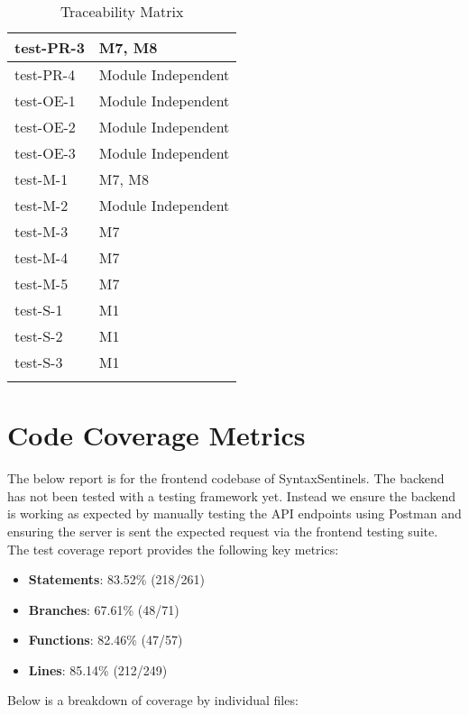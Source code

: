\documentclass[12pt, titlepage]{article}
\begin{document}
\begin{center}
\begin{longtable}{|>{\centering\arraybackslash}p{4cm}|>{\centering\arraybackslash}p{10cm}|}
    test-PR-3 &  M7, M8\\
    \hline
    test-PR-4 &  Module Independent\\
    \hline
    test-OE-1 & Module Independent\\
    \hline
    test-OE-2 & Module Independent\\
    \hline
    test-OE-3 & Module Independent\\
    \hline
    test-M-1 & M7, M8 \\
    \hline
    test-M-2 & Module Independent\\
    \hline
    test-M-3 & M7 \\
    \hline
    test-M-4 & M7 \\
    \hline
    test-M-5 & M7 \\
    \hline
    test-S-1 & M1 \\
    \hline
    test-S-2 & M1 \\
    \hline
    test-S-3 & M1 \\
    \hline
  
    \caption{Traceability Matrix}
    \end{longtable}
    \end{center}

\section{Code Coverage Metrics}

The below report is for the frontend codebase of SyntaxSentinels. The backend has not been tested with a testing framework yet.
Instead we ensure the backend is working as expected by manually testing the API endpoints using Postman and ensuring the server is sent the 
expected request via the frontend testing suite. \\

The test coverage report provides the following key metrics:

\begin{itemize}
\item \textbf{Statements}: 83.52\% (218/261)
\item \textbf{Branches}: 67.61\% (48/71)
\item \textbf{Functions}: 82.46\% (47/57)
\item \textbf{Lines}: 85.14\% (212/249)
\end{itemize}

\newpage

Below is a breakdown of coverage by individual files:
\end{document}
